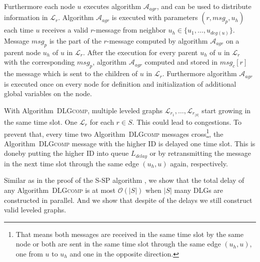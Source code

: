 \documentclass[11pt]{article}
\newcommand{\BO}{\mathcal{O}}
\newcommand{\calL}{\mathcal{L}}
\newif\iffull
\begin{document}
Furthermore each node $u$ executes algorithm ${\mathcal{A}}_{agr}$\iffull (Line \ref{line:exf})\fi, and can be used to distribute information in $\calL_r$. Algorithm ${\mathcal{A}}_{agr}$ is executed with parameters $(r,msg_p,u_h)$ each time $u$ receives a valid $r$-message from neighbor $u_h\in \{u_1,\dots,u_{deg(u)}\}$. Message $msg_p$ is the part of the $r$-message computed by algorithm ${\mathcal{A}}_{agr}$ on a parent node $u_h$ of $u$ in $\calL_r$.
After the execution for every parent  $u_h$ of $u$ in $\calL_r$ with the corresponding $msg_p$,  algorithm ${\mathcal{A}}_{agr}$ computed and stored in $msg_c[r]$ the message which is sent to the children of $u$ in $\calL_r$\iffull (Line \ref{line:sendreceivedist})\fi. Furthermore algorithm ${\mathcal{A}}_{agr}$ is executed once on every node for definition and initialization of additional global variables on the node\iffull (Line \ref{line:DLGinitf})\fi.

With Algorithm\iffull~\ref{alg:DLGcomp}\fi~\textsc{DLGcomp}, multiple leveled graphs $\calL_{r_1},\dots, \calL_{r_{|S|}}$ start growing in the same time slot. One $\calL_r$ for each $r\in S$. This could lead to congestions. To prevent that, every time two Algorithm\iffull~\ref{alg:DLGcomp}\fi~\textsc{DLGcomp} messages cross\footnote{That means both messages are received in the same time slot by the same node or both are sent in the same time slot through the same edge $(u_h,u)$, one from $u$ to $u_h$ and one in the opposite direction.}, the Algorithm\iffull~\ref{alg:DLGcomp}\fi~\textsc{DLGcomp} message with the higher ID is delayed one time slot. 
This is done\iffull in Line \ref{line:DLGputLdelay}\fi by putting the higher ID into queue $L_{delay}$ or by retransmitting the message in the next time slot through the same edge $(u_h,u)$ again, respectively\iffull (due to the if-statement in Line \ref{line:DLGdelay})\fi.

Similar as in the proof of the S-SP algorithm \cite{holzer2012optimal}, we show that the total delay of any Algorithm\iffull~\ref{alg:DLGcomp}\fi~\textsc{DLGcomp} is at most $\BO(|S|)$ when $|S|$ many DLGs are constructed in parallel. And we show that despite of the delays we still construct valid leveled graphs.
\end{document}
